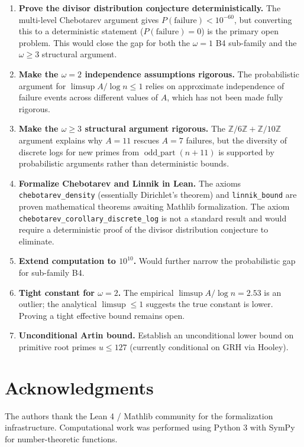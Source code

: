 \documentclass[11pt,a4paper]{article}
\theoremstyle{plain}
\theoremstyle{plain}
\theoremstyle{definition}
\numberwithin{equation}{section}
\begin{document}
\begin{enumerate}
  \item \textbf{Prove the divisor distribution conjecture deterministically.} The multi-level Chebotarev argument gives $P(\text{failure}) < 10^{-60}$, but converting this to a deterministic statement ($P(\text{failure}) = 0$) is the primary open problem. This would close the gap for both the $\omega = 1$ B4 sub-family and the $\omega \geq 3$ structural argument.
  \item \textbf{Make the $\omega = 2$ independence assumptions rigorous.} The probabilistic argument for $\limsup A/\log n \leq 1$ relies on approximate independence of failure events across different values of $A$, which has not been made fully rigorous.
  \item \textbf{Make the $\omega \geq 3$ structural argument rigorous.} The $\mathbb{Z}/6\mathbb{Z} + \mathbb{Z}/10\mathbb{Z}$ argument explains why $A = 11$ rescues $A = 7$ failures, but the diversity of discrete logs for new primes from $\operatorname{odd\_part}(n+11)$ is supported by probabilistic arguments rather than deterministic bounds.
  \item \textbf{Formalize Chebotarev and Linnik in Lean.} The axioms \texttt{chebotarev\_density} (essentially Dirichlet's theorem) and \texttt{linnik\_bound} are proven mathematical theorems awaiting Mathlib formalization. The axiom \texttt{chebotarev\_corollary\_discrete\_log} is not a standard result and would require a deterministic proof of the divisor distribution conjecture to eliminate.
  \item \textbf{Extend computation to $10^{10}$.} Would further narrow the probabilistic gap for sub-family B4.
  \item \textbf{Tight constant for $\omega = 2$.} The empirical $\limsup A/\log n = 2.53$ is an outlier; the analytical $\limsup \leq 1$ suggests the true constant is lower. Proving a tight effective bound remains open.
  \item \textbf{Unconditional Artin bound.} Establish an unconditional lower bound on primitive root primes $u \leq 127$ (currently conditional on GRH via Hooley).
\end{enumerate}

\section*{Acknowledgments}

The authors thank the Lean 4 / Mathlib community for the formalization infrastructure. Computational work was performed using Python 3 with SymPy for number-theoretic functions.
\end{document}
